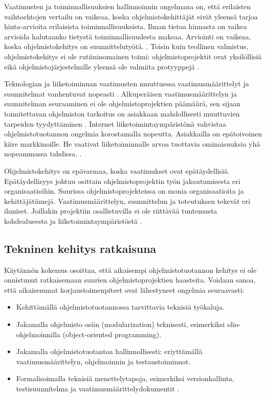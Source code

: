 \documentclass[finnish]{tktltiki2}
\theoremstyle{definition}
\theoremstyle{remark}
\begin{document}
Vaatimusten ja toiminnallisuuksien hallinnoinnin ongelmana on, että erilaisten vaihtoehtojen vertailu on vaikeaa, koska ohjelmistokehittäjät eivät yleensä tarjoa hinta-arvioita erilaisista toiminnallisuuksista. Ilman tietoa hinnasta on vaikea arvioida halutaanko tietystä toiminnallisuudesta maksaa. Arviointi on vaikeaa, koska ohjelmistokehitys on suunnittelutyötä. \cite{FOW01a}. Toisin kuin teollinen valmistus, ohjelmistokehitys ei ole rutiininomainen toimi: ohjelmistoprojektit ovat yksilöllisiä eikä ohjelmistojärjestelmille yleensä ole valmiita protyyppejä \cite{KES95}.

Teknologian ja liiketoiminnan vaatimusten muuttuessa vaatimusmäärittelyt ja suunnitelmat vanhentuvat nopeasti \cite{WIC03}. Alkuperäisen vaatimusmäärittelyn ja suunnitelman seuraaminen ei ole ohjelmistoprojektien päämäärä, sen sijaan toimitettavan ohjelmiston tarkoitus on asiakkaan mahdollisesti muuttuvien tarpeiden tyydyttäminen \cite{HIC01}. Internet liiketoimintaympäristönä vahvistaa ohjelmistotuotannon ongelmia korostamalla nopeutta. Asiakkailla on epätoivoinen kiire markkinoille. He vaativat liiketoiminnalle arvoa tuottavia ominaisuuksia yhä nopeammassa tahdissa. \cite{BRL03}.

Ohjelmistokehitys on epävarmaa, koska vaatimukset ovat epätäydellisiä. Epätäydellisyys johtuu osittain ohjelmistoprojektin työn jakautumisesta eri organisaatioihin.
Suurissa ohjelmistoprojekteissa on monia organisaatioita ja kehittäjätiimejä. Vaatimusmäärittelyn, suunnittelun ja toteutuksen tekevät eri ihmiset. Joillakin projektiin osallistuvilla ei ole riittävää tuntemusta kohdealueesta ja liiketoimintaympäristöstä \cite{KES95}.


\subsection{Tekninen kehitys ratkaisuna}

Käytännön kokemus osoittaa, että aikaisempi ohjelmistotuotannon kehitys ei ole onnistunut ratkaisemaan suurien ohjelmistoprojektien haasteita. 
Voidaan sanoa, että aikaisemmat korjaustoimenpiteet ovat lähestyneet ongelmia seuraavasti: 
\begin{itemize}
 \item Kehittämällä ohjelmistotuotannossa tarvittavia teknisiä työkaluja.
 \item Jakamalla ohjelmisto osiin (modularization) teknisesti, esimerkiksi olio-ohjelmoinnilla (object-oriented programming). 
 \item Jakamalla ohjelmistotuotantoa hallinnollisesti: eriyttämällä vaatimusmäärittelyn, ohjelmoinnin ja testaustoiminnot.
 \item Formalisoimalla teknisiä menettelytapoja, esimerkiksi versionhallinta, testisuunnitelma ja vaatimusmäärittelydokumentit \cite{KES95}.
\end{itemize}
\end{document}
